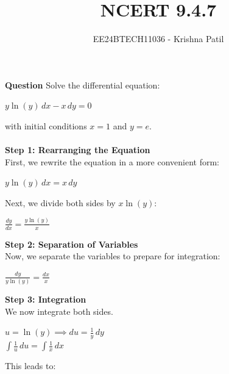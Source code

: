 \documentclass[journal]{IEEEtran}
\begin{document}

\vspace{3cm}

\title{NCERT 9.4.7}
\author{EE24BTECH11036 - Krishna Patil}
{\let\newpage\relax\maketitle}

\renewcommand{\thefigure}{\theenumi}
\renewcommand{\thetable}{\theenumi}
\setlength{\intextsep}{10pt} %

\textbf{Question} Solve the differential equation:

\begin{center}
$ y \ln(y) \, dx - x \, dy = 0 $
\end{center}

with initial conditions $ x = 1 $ and $ y = e $. \\
\solution \\
\textbf{Step 1: Rearranging the Equation} \\
First, we rewrite the equation in a more convenient form:
\begin{center}
$ y \ln(y) \, dx = x \, dy $
\end{center}

Next, we divide both sides by $ x \ln(y) $:

\begin{center}
$ \frac{dy}{dx} = \frac{y \ln(y)}{x} $
\end{center}

\textbf{Step 2: Separation of Variables} \\
Now, we separate the variables to prepare for integration:

\begin{center}
$ \frac{dy}{y \ln(y)} = \frac{dx}{x} $
\end{center}

\textbf{Step 3: Integration} \\
We now integrate both sides.
\begin{center}
$ u = \ln(y) \implies du = \frac{1}{y} \, dy $ \\
$ \int \frac{1}{u} \, du = \int \frac{1}{x} \, dx $
\end{center}

This leads to:
\end{document}
